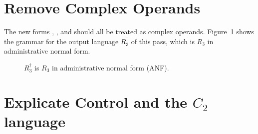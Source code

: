 \documentclass[11pt]{book}
\newcommand{\gray}[1]{{\color{gray} #1}}
\begin{document}
\section{Remove Complex Operands}
\label{sec:remove-complex-opera-R3}

The new forms , , and 
should all be treated as complex operands.
Figure~\ref{fig:r3-anf-syntax}
shows the grammar for the output language $R_3^{\dagger}$ of this
pass, which is $R_3$ in administrative normal form.

\begin{figure}[tp]
\centering
\fbox{
\begin{minipage}{0.96\textwidth}
\small
\[
\begin{array}{rcl}
  \Atm &::=& \gray{ \INT{\Int} \mid \VAR{\Var} \mid \BOOL{\itm{bool}} }
       \mid \VOID{} \\
\Exp &::=& \gray{ \Atm \mid \READ{} } \\
   &\mid& \gray{ \NEG{\Atm} \mid \ADD{\Atm}{\Atm} } \\
   &\mid& \gray{ \LET{\Var}{\Exp}{\Exp} } \\
   &\mid& \gray{ \UNIOP{\key{'not}}{\Atm} } \\
   &\mid& \gray{ \BINOP{\itm{cmp}}{\Atm}{\Atm} \mid \IF{\Exp}{\Exp}{\Exp} }\\
   &\mid& \LP\key{Collect}~\Int\RP \mid \LP\key{Allocate}~\Int~\Type\RP
   \mid \LP\key{GlobalValue}~\Var\RP\\
R^{\dagger}_3  &::=& \gray{ \PROGRAM{\code{'()}}{\Exp} }
\end{array}
\]
\end{minipage}
}
\caption{$R_3^{\dagger}$ is $R_3$ in administrative normal form (ANF).}
\label{fig:r3-anf-syntax}
\end{figure}


\section{Explicate Control and the $C_2$ language}
\label{sec:explicate-control-r3}
\end{document}
